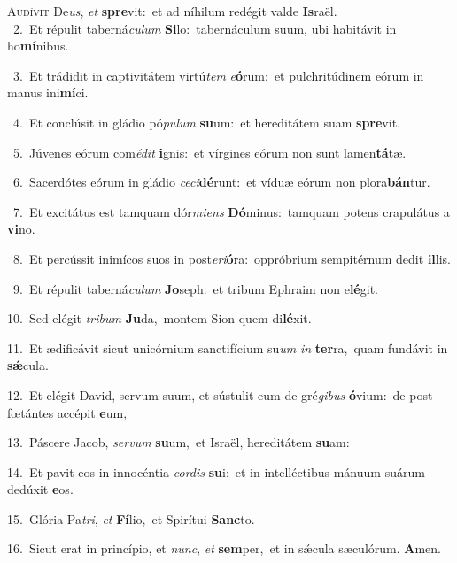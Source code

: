 \lettrine{\initial\textcolor{\initialcolor}{A}}{udívit} De\-\textit{us}\-, \textit{et} \textbf{spre}\-vit:~\star et ad níhilum redégit valde \textbf{Is}\-raël.\\
{\numbfont\textcolor{\numbcolor}{~2.}}~Et répulit taberná\-\textit{cu}\-\textit{lum} \textbf{Si}\-lo:~\star tabernáculum suum, ubi habitávit in ho\-\textbf{mí}\-nibus.\par
{\numbfont\textcolor{\numbcolor}{~3.}}~Et trádidit in captivitátem virtú\textit{tem} \textit{e}\-\textbf{ó}rum:~\star et pulchritúdinem eórum in manus ini\-\textbf{mí}\-ci.\par
{\numbfont\textcolor{\numbcolor}{~4.}}~Et conclúsit in gládio pó\-\textit{pu}\-\textit{lum} \textbf{su}\-um:~\star et hereditátem suam \textbf{spre}\-vit.\par
{\numbfont\textcolor{\numbcolor}{~5.}}~Júvenes eórum com\-\textit{é}\-\textit{dit} \textbf{i}\-gnis:~\star et vírgines eórum non sunt lamen\-\textbf{tá}\-tæ.\par
{\numbfont\textcolor{\numbcolor}{~6.}}~Sacerdótes eórum in gládio \textit{ce}\-\textit{ci}\textbf{dé}runt:~\star et víduæ eórum non plora\-\textbf{bán}\-tur.\par
{\numbfont\textcolor{\numbcolor}{~7.}}~Et excitátus est tamquam dór\-\textit{mi}\-\textit{ens} \textbf{Dó}\-minus:~\star tamquam potens crapulátus a \textbf{vi}\-no.\par
{\numbfont\textcolor{\numbcolor}{~8.}}~Et percússit inimícos suos in post\-\textit{e}\-\textit{ri}\textbf{ó}ra:~\star oppróbrium sempitérnum dedit \textbf{il}\-lis.\par
{\numbfont\textcolor{\numbcolor}{~9.}}~Et répulit taberná\-\textit{cu}\-\textit{lum} \textbf{Jo}\-seph:~\star et tribum Ephraim non e\-\textbf{lé}\-git.\par
{\numbfont\textcolor{\numbcolor}{10.}}~Sed elégit \textit{tri}\-\textit{bum} \textbf{Ju}\-da,~\star montem Sion quem di\-\textbf{lé}\-xit.\par
{\numbfont\textcolor{\numbcolor}{11.}}~Et ædificávit sicut unicórnium sanctifícium su\textit{um} \textit{in} \textbf{ter}\-ra,~\star quam fundávit in \textbf{sǽ}\-cula.\par
{\numbfont\textcolor{\numbcolor}{12.}}~Et elégit David, servum suum, et sústulit eum de gré\-\textit{gi}\-\textit{bus} \textbf{ó}\-vium:~\star de post fœtántes accépit \textbf{e}\-um,\par
{\numbfont\textcolor{\numbcolor}{13.}}~Páscere Jacob, \textit{ser}\-\textit{vum} \textbf{su}\-um,~\star et Israël, hereditátem \textbf{su}\-am:\par
{\numbfont\textcolor{\numbcolor}{14.}}~Et pavit eos in innocéntia \textit{cor}\-\textit{dis} \textbf{su}\-i:~\star et in intelléctibus mánuum suárum dedúxit \textbf{e}\-os.\par
{\numbfont\textcolor{\numbcolor}{15.}}~Glória Pa\-\textit{tri}\-, \textit{et} \textbf{Fí}\-lio,~\star et Spirítui \textbf{Sanc}\-to.\par
{\numbfont\textcolor{\numbcolor}{16.}}~Sicut erat in princípio, et \textit{nunc}\-, \textit{et} \textbf{sem}\-per,~\star et in sǽcula sæculórum. \textbf{A}\-men.\par
